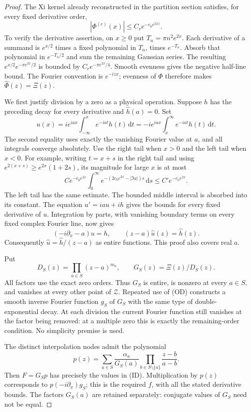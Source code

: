 \documentclass[11pt]{article}
\theoremstyle{remark}\newtheorem{remark}[theorem]{Remark}
\newcommand{\dd}{\,\mathrm d}
\begin{document}
\begin{proof}
The Xi kernel already reconstructed in the partition section
satisfies, for every fixed derivative order,
\[
 |\Phi^{(r)}(x)|\le C_r e^{-c_0 e^{2|x|}}.
\]
To verify the derivative assertion, on $x\ge0$ put
$T_n=\pi n^2e^{2x}$. Each derivative of a summand is
$e^{x/2}$ times a fixed polynomial in $T_n$, times $e^{-T_n}$.
Absorb that polynomial in $e^{-T_n/2}$ and sum the remaining
Gaussian series. The resulting $e^{x/2}e^{-\pi e^{2x}/2}$
is bounded by $C_r e^{-\pi e^{2x}/4}$.
Smooth evenness gives the negative half-line bound.
The Fourier convention is $e^{-izx}$; evenness of $\Phi$
therefore makes $\widehat\Phi(z)=\Xi(z)$.

We first justify division by a zero as a physical operation.
Suppose $h$ has the preceding decay for every derivative and
$\widehat h(a)=0$. Set
\[
 u(x)=i e^{iax}\int_{-\infty}^x e^{-iat}h(t)\dd t
     =-i e^{iax}\int_x^\infty e^{-iat}h(t)\dd t.          \tag{OD}
\]
The second equality uses exactly the vanishing Fourier value
at $a$, and all integrals converge absolutely.
Use the right tail when $x>0$ and the left tail when $x<0$.
For example, writing $t=x+s$ in the right tail and using
$e^{2(x+s)}\ge e^{2x}(1+2s)$, its magnitude for large $x$
is at most
\[
 C e^{-c_0e^{2x}}\int_0^\infty
       e^{-(2c_0e^{2x}-|\Im a|)s}\dd s
       \le C' e^{-c_0e^{2x}}.
\]
The left tail has the same estimate. The bounded middle
interval is absorbed into its constant.
The equation $u'=ia u+ih$ gives the bounds for every fixed
derivative of $u$. Integration by parts, with vanishing
boundary terms on every fixed complex Fourier line, now gives
\[
 (-i\partial_x-a)u=h,\qquad
              (z-a)\widehat u(z)=\widehat h(z).
\]
Consequently $\widehat u=\widehat h/(z-a)$ as entire functions.
This proof also covers real $a$.

Put
\[
 D_S(z)=\prod_{a\in S}(z-a)^{m_a},\qquad
                   G_S(z)=\Xi(z)/D_S(z).
\]
All factors use the exact zero orders. Thus $G_S$ is entire,
is nonzero at every $a\in S$, and vanishes at every other
point of $\mathcal Z$. Repeated use of (OD) constructs a
smooth inverse Fourier function $g_S$ of $G_S$ with the
same type of double-exponential decay. At each division
the current Fourier function still vanishes at the factor
being removed: at a multiple zero this is exactly the
remaining-order condition. No simplicity premise is used.

The distinct interpolation nodes admit the polynomial
\[
 p(z)=\sum_{a\in S}\frac{\alpha_a}{G_S(a)}
                   \prod_{b\in S\setminus\{a\}}\frac{z-b}{a-b}.
\]
Then $F=G_Sp$ has precisely the values in (ID).
Multiplication by $p(z)$ corresponds to $p(-i\partial_x)g_S$;
this is the required $f$, with all the stated derivative bounds.
The factors $G_S(a)$ are retained separately: conjugate
values of $G_S$ need not be equal.


\end{proof}
\end{document}
